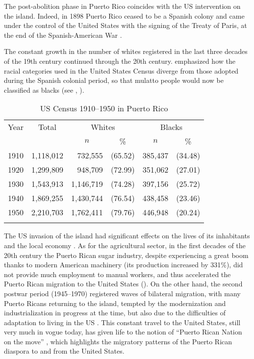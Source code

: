 \documentclass[output=paper,colorlinks,citecolor=brown]{langscibook}
\begin{document}
The post-abolition phase in Puerto Rico coincides with the US intervention on the island. Indeed, in 1898 Puerto Rico ceased to be a Spanish colony and came under the control of the United States with the signing of the Treaty of Paris, at the end of the Spanish-American War \citep{Orama-López2012}.

\begin{sloppypar}
The constant growth in the number of whites registered in the last three decades of the 19th century continued through the 20th century. \citet[79]{AlvarezNazario1974} emphasized how the racial categories used in the United States Census diverge from those adopted during the Spanish colonial period, so that mulatto people would now be classified as blacks (see , \citealt[79]{AlvarezNazario1974}).
\end{sloppypar}

\begin{table}
\begin{tabular}{cc *2{r@{ }r}}
\lsptoprule
 {Year} & {Total} & \multicolumn{2}{c}{Whites} & \multicolumn{2}{c}{Blacks}\\\cmidrule(lr){3-4}\cmidrule(lr){5-6}
        &         & \multicolumn{1}{c}{$n$} & \multicolumn{1}{c}{\%} & \multicolumn{1}{c}{$n$} & \multicolumn{1}{c}{\%}\\\midrule
 1910 & 1,118,012 &   732,555 & (65.52) & 385,437 & (34.48)\\
 1920 & 1,299,809 &   948,709 & (72.99) & 351,062 & (27.01)\\
 1930 & 1,543,913 & 1,146,719 & (74.28) & 397,156 & (25.72)\\
 1940 & 1,869,255 & 1,430,744 & (76.54) & 438,458 & (23.46)\\
 1950 & 2,210,703 & 1,762,411 & (79.76) & 446,948 & (20.24)\\
\lspbottomrule
\end{tabular}
\caption{US Census 1910--1950 in Puerto Rico\label{tab:visconti:10}}
\end{table}

The US invasion of the island had significant effects on the lives of its inhabitants and the local economy \citep{Shekitka2017}. As for the agricultural sector, in the first decades of the 20th century the Puerto Rican sugar industry, despite experiencing a great boom thanks to modern American machinery (its production increased by 331\%), did not provide much employment to manual workers, and thus accelerated the Puerto Rican migration to the United States (\citealt{ayala_bernabe2007}). On the other hand, the second postwar period (1945--1970) registered waves of bilateral migration, with many Puerto Ricans returning to the island, tempted by the modernization and industrialization in progress at the time, but also due to the difficulties of adaptation to living in the US \citep{Thomas2010}. This constant travel to the United States, still very much in vogue today, has given life to the notion of “Puerto Rican Nation on the move” \citep{Duany2000}, which highlights the migratory patterns of the Puerto Rican diaspora to and from the United States.
\end{document}
